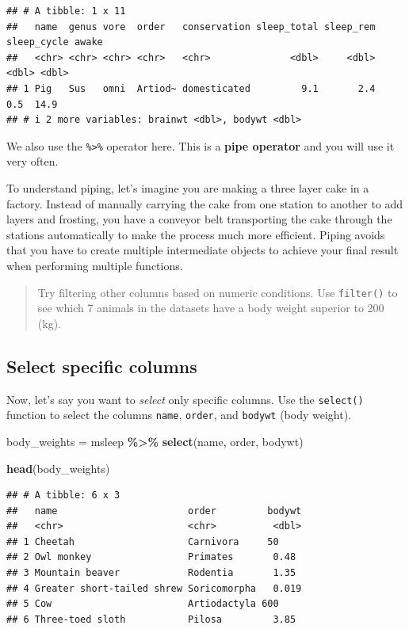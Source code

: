 \documentclass[
]{book}
\newenvironment{Shaded}{\begin{snugshade}}{\end{snugshade}}
\newcommand{\FunctionTok}[1]{\textcolor[rgb]{0.13,0.29,0.53}{\textbf{#1}}}
\newcommand{\NormalTok}[1]{#1}
\newcommand{\OtherTok}[1]{\textcolor[rgb]{0.56,0.35,0.01}{#1}}
\newcommand{\SpecialCharTok}[1]{\textcolor[rgb]{0.81,0.36,0.00}{\textbf{#1}}}
\begin{document}
\begin{verbatim}
## # A tibble: 1 x 11
##   name  genus vore  order   conservation sleep_total sleep_rem sleep_cycle awake
##   <chr> <chr> <chr> <chr>   <chr>              <dbl>     <dbl>       <dbl> <dbl>
## 1 Pig   Sus   omni  Artiod~ domesticated         9.1       2.4         0.5  14.9
## # i 2 more variables: brainwt <dbl>, bodywt <dbl>
\end{verbatim}

We also use the \texttt{\%\textgreater{}\%} operator here.
This is a \textbf{pipe operator} and you will use it very often.

To understand piping, let's imagine you are making a three layer cake in a factory.
Instead of manually carrying the cake from one station to another to add layers and frosting, you have a conveyor belt transporting the cake through the stations automatically to make the process much more efficient.
Piping avoids that you have to create multiple intermediate objects to achieve your final result when performing multiple functions.

\begin{quote}
Try filtering other columns based on numeric conditions.
Use \texttt{filter()} to see which 7 animals in the datasets have a body weight superior to 200 (kg).
\end{quote}

\hypertarget{select-specific-columns}{%
\subsection*{Select specific columns}\label{select-specific-columns}}

Now, let's say you want to \emph{select} only specific columns.
Use the \texttt{select()} function to select the columns \texttt{name}, \texttt{order}, and \texttt{bodywt} (body weight).

\begin{Shaded}
\begin{Highlighting}[]
\NormalTok{body\_weights }\OtherTok{=}\NormalTok{ msleep }\SpecialCharTok{\%\textgreater{}\%}
  \FunctionTok{select}\NormalTok{(name, order, bodywt)}

\FunctionTok{head}\NormalTok{(body\_weights)}
\end{Highlighting}
\end{Shaded}

\begin{verbatim}
## # A tibble: 6 x 3
##   name                       order         bodywt
##   <chr>                      <chr>          <dbl>
## 1 Cheetah                    Carnivora     50    
## 2 Owl monkey                 Primates       0.48 
## 3 Mountain beaver            Rodentia       1.35 
## 4 Greater short-tailed shrew Soricomorpha   0.019
## 5 Cow                        Artiodactyla 600    
## 6 Three-toed sloth           Pilosa         3.85
\end{verbatim}
\end{document}
